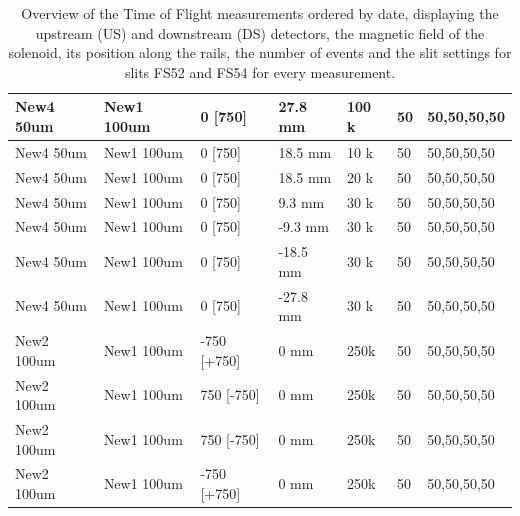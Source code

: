 \begin{refsection}
\begin{table}
\begin{tabular}{|l|l|l|l|l|l|l|}
            New4 50um   & New1 100um  & 0 {[}750{]}      & 27.8 mm  & 100 k  & 50            & 50,50,50,50       \\ \hline
            New4 50um   & New1 100um  & 0 {[}750{]}      & 18.5 mm  & 10 k   & 50            & 50,50,50,50       \\ \hline
            New4 50um   & New1 100um  & 0 {[}750{]}      & 18.5 mm  & 20 k   & 50            & 50,50,50,50       \\ \hline
            New4 50um   & New1 100um  & 0 {[}750{]}      & 9.3 mm   & 30 k   & 50            & 50,50,50,50       \\ \hline
            New4 50um   & New1 100um  & 0 {[}750{]}      & -9.3 mm  & 30 k   & 50            & 50,50,50,50       \\ \hline
            New4 50um   & New1 100um  & 0 {[}750{]}      & -18.5 mm & 30 k   & 50            & 50,50,50,50       \\ \hline
            New4 50um   & New1 100um  & 0 {[}750{]}      & -27.8 mm & 30 k   & 50            & 50,50,50,50       \\ \hline
            New2 100um  & New1 100um  & -750 {[}+750{]}  & 0 mm     & 250k   & 50            & 50,50,50,50       \\ \hline
            New2 100um  & New1 100um  & 750 {[}-750{]}   & 0 mm     & 250k   & 50            & 50,50,50,50       \\ \hline
            New2 100um  & New1 100um  & 750 {[}-750{]}   & 0 mm     & 250k   & 50            & 50,50,50,50       \\ \hline
            New2 100um  & New1 100um  & -750 {[}+750{]}  & 0 mm     & 250k   & 50            & 50,50,50,50       \\ \hline
            \end{tabular}
            \caption{Overview of the Time of Flight measurements ordered by date, displaying the upstream (US) and downstream (DS) detectors, the magnetic field of the solenoid, its position along the rails, the number of events and the slit settings for slits FS52 and FS54 for every measurement.}
        \label{tab:ToFMeasurementsOverview}
        \end{table}

\printbibliography[
    heading = bibliographychapter,
    title=Bibliography on Scintillators in muEDM
]

\end{refsection}


